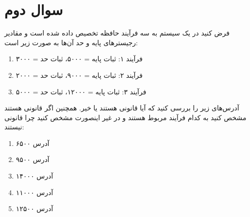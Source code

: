 \section{سوال دوم}


فرض کنید در یک سیستم به سه فرآیند حافظه تخصیص داده شده است و مقادیر رجیسترهای پایه و حد آن‌ها به صورت زیر است:

\begin{enumerate}
	\item فرآیند ۱: ثبات پایه = ۵۰۰۰، ثبات حد = ۳۰۰۰
	\item فرآیند ۲: ثبات پایه = ۹۰۰۰، ثبات حد = ۲۰۰۰
	\item فرآیند ۳: ثبات پایه = ۱۲۰۰۰، ثبات حد = ۵۰۰۰
\end{enumerate}

آدرس‌های زیر را بررسی کنید که آیا قانونی هستند یا خیر. همچنین اگر قانونی هستند مشخص کنید به کدام فرآیند مربوط هستند و در غیر اینصورت مشخص کنید چرا قانونی نیستند:

\begin{enumerate}
	\item آدرس ۶۵۰۰
	\item آدرس ۹۵۰۰
	\item آدرس ۱۴۰۰۰
	\item آدرس ۱۱۰۰۰
	\item آدرس ۱۲۵۰۰
\end{enumerate}